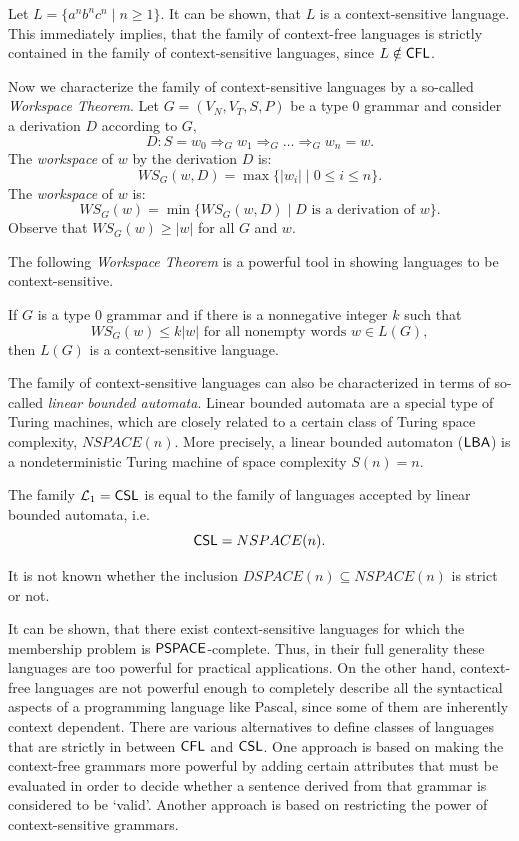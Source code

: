 Let $L = \{a^n b^n c^n \mid n \ge 1\}$. It can be shown, that $L$ is a context-sensitive language. This immediately implies, that the family of context-free languages is strictly contained in the family of context-sensitive languages, since $L \notin \CFL$.

Now we characterize the family of context-sensitive languages by a so-called \emph{Workspace Theorem}. Let $G = (V_N, V_T, S, P)$ be a type $0$ grammar and consider a derivation $D$ according to $G$, $$D: S = w_0 \Rightarrow_G w_1 \Rightarrow_G \ldots \Rightarrow_G w_n = w.$$ The \emph{workspace} of $w$ by the derivation $D$ is: $$WS_G(w, D) = \max \{|w_i| \mid 0 \le i \le n\}.$$ The \emph{workspace} of $w$ is: $$WS_G(w) = \min \{WS_G(w, D) \mid D \text{ is a derivation of } w\}.$$ Observe that $WS_G(w) \ge |w|$ for all $G$ and $w$.

The following \emph{Workspace Theorem} is a powerful tool in showing languages to be context-sensitive.

\begin{theorem}
If $G$ is a type $0$ grammar and if there is a nonnegative integer $k$ such that $$WS_G(w) \le k |w| \text{ for all nonempty words } w \in L(G),$$ then $L(G)$ is a context-sensitive language.
\end{theorem}

The family of context-sensitive languages can also be characterized in terms of so-called \emph{linear bounded automata}. Linear bounded automata are a special type of Turing machines, which are closely related to a certain class of Turing space complexity, $NSPACE(n)$. More precisely, a linear bounded automaton \index{$\LBA$}($\LBA$) is a nondeterministic Turing machine of space complexity $S(n) = n$.

\begin{theorem}
The family $\mathcal{L}_1 = \CSL$ is equal to the family of languages accepted by linear bounded automata, i.e. $$\CSL = NSPACE(n).$$
\end{theorem}

It is not known whether the inclusion $DSPACE(n) \subseteq NSPACE(n)$ is strict or not.

It can be shown, that there exist context-sensitive languages for which the membership problem is $\classPSPACE$-complete. Thus, in their full generality these languages are too powerful for practical applications. On the other hand, context-free languages are not powerful enough to completely describe all the syntactical aspects of a programming language like Pascal, since some of them are inherently context dependent. There are various alternatives to define classes of languages that are strictly in between \index{$\CFL$}$\CFL$ and \index{$\CSL$}$\CSL$. One approach is based on making the context-free grammars more powerful by adding certain attributes that must be evaluated in order to decide whether a sentence derived from that grammar is considered to be `valid'. Another approach is based on restricting the power of context-sensitive grammars.

